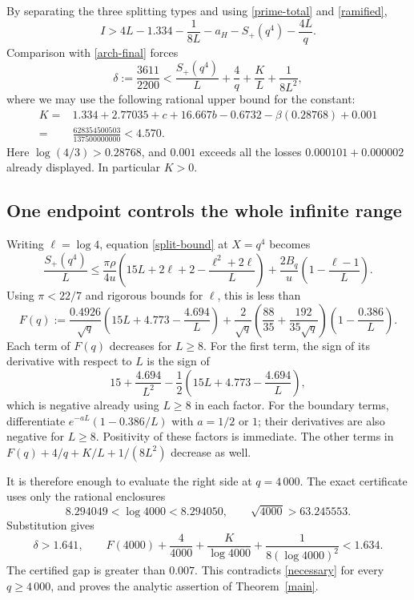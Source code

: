 \documentclass[11pt]{article}
\begin{document}
By separating the three splitting types and using \eqref{prime-total}
and \eqref{ramified},
\[
 I>4L-1.334-\frac1{8L}-a_H-S_+(q^4)-\frac{4L}{q}.
\]
Comparison with \eqref{arch-final} forces
\begin{equation}\label{necessary}
 \delta:=\frac{3611}{2200}
 <\frac{S_+(q^4)}L+\frac4q+\frac KL+\frac1{8L^2},
\end{equation}
where we may use the following rational upper bound for the constant:
\begin{align}
 K={}&1.334+2.77035+c+16.667b-0.6732
       -\beta(0.28768)+0.001\label{k}\\
 ={}&\frac{628354500503}{137500000000}<4.570.\nonumber
\end{align}
Here \(\log(4/3)>0.28768\), and \(0.001\) exceeds all the losses
\(0.000101+0.000002\) already displayed. In particular \(K>0\).

\subsection{One endpoint controls the whole infinite range}

Writing \(\ell=\log4\), equation \eqref{split-bound} at \(X=q^4\)
becomes
\[
 \frac{S_+(q^4)}L\le
 \frac{\pi\rho}{4u}
 \left(15L+2\ell+2-\frac{\ell^2+2\ell}{L}\right)
 +\frac{2B_q}{u}\left(1-\frac{\ell-1}{L}\right).
\]
Using \(\pi<22/7\) and rigorous bounds for \(\ell\), this is less than
\begin{equation}\label{split-uniform}
 F(q):=\frac{0.4926}{\sqrt q}
 \left(15L+4.773-\frac{4.694}{L}\right)
 +\frac{2}{\sqrt q}\left(\frac{88}{35}+\frac{192}{35\sqrt q}\right)
 \left(1-\frac{0.386}{L}\right).
\end{equation}
Each term of \(F(q)\) decreases for \(L\ge8\). For the first term,
the sign of its derivative with respect to \(L\) is the sign of
\[
 15+\frac{4.694}{L^2}
 -\frac12\left(15L+4.773-\frac{4.694}{L}\right),
\]
which is negative already using \(L\ge8\) in each factor.
For the boundary terms, differentiate
\(e^{-aL}(1-0.386/L)\) with \(a=1/2\) or \(1\); their derivatives
are also negative for \(L\ge8\). Positivity of these factors is
immediate. The other terms in
\(F(q)+4/q+K/L+1/(8L^2)\) decrease as well.

It is therefore enough to evaluate the right side at \(q=4\,000\).
The exact certificate uses only the rational enclosures
\[
 8.294049<\log4000<8.294050,\qquad
 \sqrt{4000}>63.245553.
\]
Substitution gives
\[
 \delta>1.641,\qquad
 F(4000)+\frac4{4000}+\frac{K}{\log4000}
       +\frac1{8(\log4000)^2}<1.634.
\]
The certified gap is greater than \(0.007\).
This contradicts \eqref{necessary} for every \(q\ge4\,000\),
and proves the analytic assertion of Theorem~\ref{main}.
\end{document}
